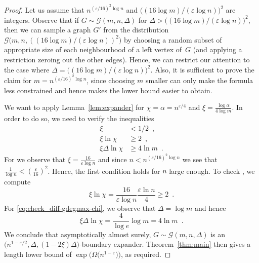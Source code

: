 \documentclass{theoretics}
\newcommand{\eqperiod}{\enspace .}
\newcommand{\eqcomma}{\enspace ,}
\newcommand{\refthm}[1]{Theorem~\ref{#1}}
\newcommand{\reflem}[1]{Lemma~\ref{#1}}
\newcommand{\diff}{\xi}
\newcommand{\cdiff}{4}
\newcommand{\GdegMax}{\Delta}
\newcommand{\gdegmax}{\GdegMax}
\newcommand{\Gdist}{\mathcal{G}}
\newcommand{\constFPHPnew}{16}
\newcommand{\exponentalpha}{\varepsilon}
\numberwithin{equation}{section}
\begin{document}
\begin{proof}
  Let us assume that
  $n^{\left( \exponentalpha/\constFPHPnew \right)^2 \log n}$ and
  $\bigl( ({\constFPHPnew \log m}) / ({\exponentalpha \log n} )
  \bigr)^2$ are integers.  Observe that if
  $G \sim \Gdist \left(m,n,\GdegMax \right)$ for
  $\GdegMax > \bigl( ({\constFPHPnew \log m}) / ({\exponentalpha \log
    n}) \bigr)^2 $, then
  we can sample a graph
  $G'$ from the distribution $\Gdist 
  \bigl(m,n, ( 
      ({\constFPHPnew \log m}) / ({\exponentalpha \log n}) 
      )^2 \bigr)
  $
  by choosing a random subset of appropriate size of each neighbourhood
  of a left vertex of~$G$ (and applying a restriction zeroing out the other
  edges). 
  Hence, we can restrict our attention
  to the case where 
  $\GdegMax= 
  \bigl( ({\constFPHPnew \log m}) / ({\exponentalpha \log n}) \bigr)^2
  $.
  Also, it is sufficient to prove the claim for 
  $m = n^{\left( \exponentalpha/\constFPHPnew \right)^2 \log n}$,
  since choosing $m$ smaller can only make the formula less
  constrained and hence makes the lower bound easier to obtain.

  We want to apply \reflem{lem:expander} for 
  $\chi = \alpha = n^{\exponentalpha/4}$
  and
  $\diff = \frac{\log \alpha}{\cdiff \log m}$.
  In order to do so, we need to verify the inequalities
  \begin{subequations}
    \begin{align}
      \label{eq:check_diff}
      \diff &< 1/2 \eqcomma \\
      \label{eq:check_diff-chi}
      \diff \ln \chi &\geq 2 \eqcomma \\
      \label{eq:check_diff-gdegmax-chi}
      \diff \gdegmax \ln \chi &\geq 4 \ln m \eqperiod
    \end{align}
  \end{subequations}
  For  we observe that 
  $\diff = \frac{16}{\exponentalpha \log n}$
  and
  since
  $n < n^{\left(\exponentalpha/\constFPHPnew \right)^2 \log n}$
  we see that
  $\frac{1}{\log n} < \left(\frac{\exponentalpha}{\constFPHPnew}\right)^2$. 
  Hence, the first condition
  holds for $n$ large enough.
  To check , we compute
  \begin{equation}
    \diff \ln \chi 
    =
    \frac
    { 16  }
    { \varepsilon \log n}
    \frac{\varepsilon \ln n}{4}
    \ge 2 \eqperiod
  \end{equation}
  For
  \eqref{eq:check_diff-gdegmax-chi},
  we observe that $\gdegmax = \log m$ and hence
  \begin{equation}
    \diff \gdegmax \ln \chi 
    =
    \frac{4}{\log e} \log m
    =  4 \ln m  \eqperiod
  \end{equation}
  We conclude 
  that
  asymptotically almost surely,
  $G \sim \Gdist \left(m,n,\GdegMax \right)$ is an
  $\bigl( n^{1 - \exponentalpha/2}, \GdegMax, 
  (1 - 2 \diff)\GdegMax \bigr)$-boundary expander.
  \refthm{thm:main} then gives a length lower bound
  of $\exp\bigl( \Omega \bigl( n^{1 - \exponentalpha} \bigr) \bigr)$,
  as required.
\end{proof}
\end{document}
